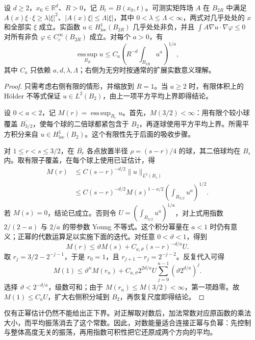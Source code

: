 \begin{lemma}[局部上界的低次平均版本]
\label{b2:lem:H2-small-power}
设 \(d\geq2\)，\(x_0\in\mathbb R^d\)、\(R>0\)，记 \(B_t=B(x_0,t)\)。可测实矩阵场 \(A\) 在 \(B_{2R}\) 中满足
\(A(x)\xi\cdot\xi\geq\lambda|\xi|^2\)、\(|A(x)\xi|\leq\Lambda|\xi|\)，其中 \(0<\lambda\leq\Lambda<\infty\)，两式对几乎处处的 \(x\) 和全部实 \(\xi\) 成立。实函数 \(u\in H^1_{\mathrm{loc}}(B_{2R})\) 几乎处处非负，并且
\(\int A\nabla u\cdot\nabla\varphi\leq0\) 对所有非负 \(\varphi\in C_c^\infty(B_{2R})\) 成立。对每个 \(a>0\)，有
\[
 \operatorname*{ess\,sup}_{B_R}u
 \leq C_a\left(R^{-d}\int_{B_{2R}}u^a\right)^{1/a},
\]
其中 \(C_a\) 只依赖 \(a,d,\lambda,\Lambda\)；右侧为无穷时按通常的扩展实数意义理解。
\end{lemma}
\begin{proof}
只需考虑右侧有限的情形，并缩放到 \(R=1\)。当 \(a\geq2\) 时，有限体积上的 Hölder 不等式保证 \(u\in L^2(B_2)\)，由上一项平方平均上界即得结论。

设 \(0<a<2\)，记 \(M(r)=\operatorname*{ess\,sup}_{B_r}u\)。首先，\(M(3/2)<\infty\)：用有限个较小球覆盖 \(\overline{B_{3/2}}\)，使每个球的二倍球都紧包含于 \(B_2\)，再逐球使用平方平均上界。所需平方积分来自 \(u\in H^1_{\mathrm{loc}}(B_2)\)。这个有限性先于后面的吸收步骤。

对 \(1\leq r<s\leq3/2\)，在 \(\overline{B_r}\) 各点放置半径 \(\rho=(s-r)/4\) 的球，其二倍球均在 \(B_s\) 内。取有限子覆盖，在每个球上使用已证估计，得
\[
 \begin{aligned}
 M(r)&\leq C(s-r)^{-d/2}\|u\|_{L^2(B_s)}\\
 &\leq C(s-r)^{-d/2}M(s)^{1-a/2}
               \left(\int_{B_{3/2}}u^a\right)^{1/2}.
 \end{aligned}
\]
若 \(M(s)=0\)，结论已成立。否则令
\(U=(\int_{B_{3/2}}u^a)^{1/a}\)，对上式用指数 \(2/(2-a)\) 与 \(2/a\) 的带参数 Young 不等式。这个积分幂量在 \(a<1\) 时仍有意义；正幂的代数运算足以实施下面的迭代。对任意 \(0<\vartheta<1\)，得到
\[
 M(r)\leq\vartheta M(s)
       +C_{a,\vartheta}(s-r)^{-d/a}U.
\]
取 \(r_j=3/2-2^{-j-1}\)，于是 \(r_0=1\)，且
\(r_{j+1}-r_j=2^{-j-2}\)。反复代入可得
\[
 M(1)\leq\vartheta^nM(r_n)
   +C_{a,\vartheta}2^{2d/a}U
        \sum_{j=0}^{n-1}\left(\vartheta2^{d/a}\right)^j.
\]
选择 \(\vartheta<2^{-d/a}\)，级数可和；由于
\(M(r_n)\leq M(3/2)<\infty\)，第一项趋零。故
\(M(1)\leq C_aU\)，扩大右侧积分域到 \(B_2\)，再恢复尺度即得结论。
\end{proof}

仅有正幂估计仍然不能给出正下界。对正解取对数后，加法常数对应原函数的乘法大小，而平均振荡消去了这个常数。因此，对数能量适合连接正幂与负幂：先控制与整体高度无关的振荡，再用指数可积性把它还原成两个方向的平均。

